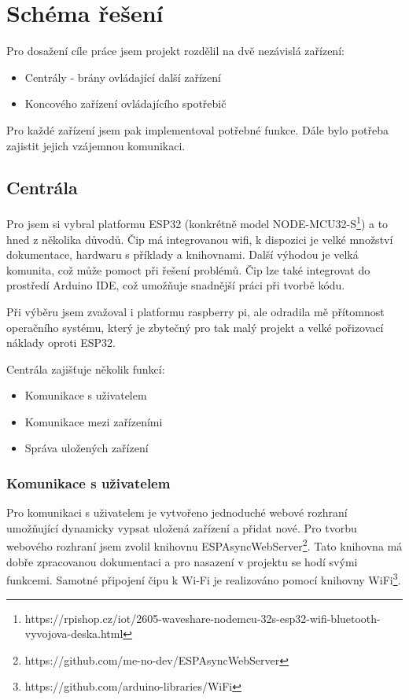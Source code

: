 \documentclass[11pt,a4paper,twoside,openright]{report}
\begin{document}
\section{Schéma řešení}

Pro dosažení cíle práce jsem projekt rozdělil na dvě nezávislá zařízení:

\begin{itemize}
	\item Centrály - brány ovládající další zařízení
	\item Koncového zařízení ovládajícího spotřebič
\end{itemize}

Pro každé zařízení jsem pak implementoval potřebné funkce. Dále bylo potřeba zajistit jejich vzájemnou komunikaci.

\subsection{Centrála}

Pro  jsem  si vybral platformu ESP32 (konkrétně model NODE-MCU32-S\footnote{https://rpishop.cz/iot/2605-waveshare-nodemcu-32s-esp32-wifi-bluetooth-vyvojova-deska.html}) a to hned z několika důvodů. Čip má integrovanou wifi, k dispozici je velké množství dokumentace, hardwaru s příklady a knihovnami. Další výhodou je velká komunita, což může pomoct při řešení problémů. Čip lze také integrovat do prostředí Arduino IDE, což umožňuje snadnější práci při tvorbě kódu.


Při výběru jsem zvažoval i platformu raspberry pi, ale odradila mě přítomnost operačního systému, který je zbytečný pro tak malý projekt a velké pořizovací náklady oproti ESP32.

Centrála zajišťuje několik funkcí:
\begin{itemize}
	\item Komunikace s uživatelem
	\item Komunikace mezi zařízeními
	\item Správa uložených zařízení
\end{itemize}

\subsubsection{Komunikace s uživatelem}

Pro komunikaci s uživatelem je vytvořeno jednoduché webové rozhraní umožňující dynamicky vypsat uložená zařízení a přidat nové. Pro tvorbu webového rozhraní jsem zvolil knihovnu ESPAsyncWebServer\footnote{https://github.com/me-no-dev/ESPAsyncWebServer}. Tato knihovna má dobře zpracovanou dokumentaci a pro nasazení v projektu se hodí svými funkcemi. Samotné připojení čipu k Wi-Fi je realizováno pomocí knihovny WiFi\footnote{https://github.com/arduino-libraries/WiFi}.
\end{document}
